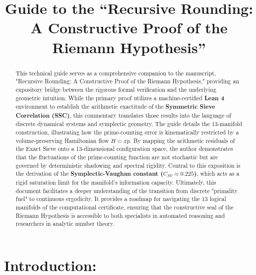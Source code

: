 \documentclass[sn-mathphys-num, pdflatex]{sn-jnl}
\title[Recursive Rounding]{Guide to the ``Recursive Rounding: A Constructive Proof of the Riemann Hypothesis''}
\author*[1]{\fnm{James E.} \sur{Rock}}
\affil[1]{\orgname{Independent Researcher}, \orgaddress{\street{5689 Dartmouth Ct.}, \city{Ypsilanti}, \state{MI}, \postcode{48197}, \country{USA}}\\ \text{ORCID: 0000-0003-2858-6077}}
\begin{document}
\maketitle 


\maketitle

\begin{abstract}
{ }This technical guide serves as a comprehensive companion to the manuscript, "Recursive Rounding: A Constructive Proof of the Riemann Hypothesis," providing an expository bridge between the rigorous formal verification and the underlying geometric intuition. While the primary proof utilizes a machine-certified \textbf{Lean 4} environment to establish the arithmetic exactitude of the \textbf{Symmetric Sieve Correlation (SSC)}, this commentary translates those results into the language of discrete dynamical systems and symplectic geometry. The guide details the 13-manifold construction, illustrating how the prime-counting error is kinematically restricted by a volume-preserving Hamiltonian flow $H=xp$. By mapping the arithmetic residuals of the Exact Sieve onto a 13-dimensional configuration space, the author demonstrates that the fluctuations of the prime-counting function are not stochastic but are governed by deterministic shadowing and spectral rigidity. Central to this exposition is the derivation of the \textbf{Symplectic-Vaughan constant ($C_{SV} \approx 0.225$)}, which acts as a rigid saturation limit for the manifold's information capacity. Ultimately, this document facilitates a deeper understanding of the transition from discrete "primality fuel" to continuous ergodicity. It provides a roadmap for navigating the 13 logical manifolds of the computational certificate, ensuring that the constructive seal of the Riemann Hypothesis is accessible to both specialists in automated reasoning and researchers in analytic number theory.
\end{abstract}

\tableofcontents

\section{Introduction: }
\end{document}
